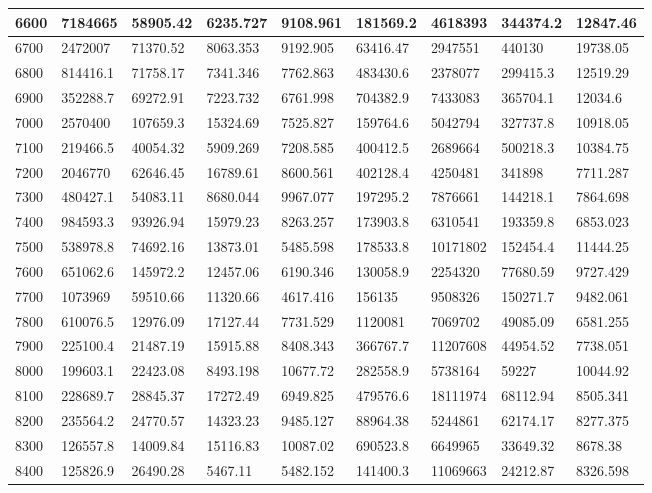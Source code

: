 \documentclass [11pt, proquest] {uwthesis}[2020/12/20]
\begin{document}
\begin{table}
\begin{tiny}
\begin{tabular}{|l|l|l|l|l|l|l|l|l|}
6600 & 7184665 & 58905.42 & 6235.727 & 9108.961 & 181569.2 & 4618393 & 344374.2 & 12847.46 \\ \hline
6700 & 2472007 & 71370.52 & 8063.353 & 9192.905 & 63416.47 & 2947551 & 440130 & 19738.05 \\ \hline
6800 & 814416.1 & 71758.17 & 7341.346 & 7762.863 & 483430.6 & 2378077 & 299415.3 & 12519.29 \\ \hline
6900 & 352288.7 & 69272.91 & 7223.732 & 6761.998 & 704382.9 & 7433083 & 365704.1 & 12034.6 \\ \hline
7000 & 2570400 & 107659.3 & 15324.69 & 7525.827 & 159764.6 & 5042794 & 327737.8 & 10918.05 \\ \hline
7100 & 219466.5 & 40054.32 & 5909.269 & 7208.585 & 400412.5 & 2689664 & 500218.3 & 10384.75 \\ \hline
7200 & 2046770 & 62646.45 & 16789.61 & 8600.561 & 402128.4 & 4250481 & 341898 & 7711.287 \\\hline
7300 & 480427.1 & 54083.11 & 8680.044 & 9967.077 & 197295.2 & 7876661 & 144218.1 & 7864.698 \\\hline
7400 & 984593.3 & 93926.94 & 15979.23 & 8263.257 & 173903.8 & 6310541 & 193359.8 & 6853.023 \\\hline
7500 & 538978.8 & 74692.16 & 13873.01 & 5485.598 & 178533.8 & 10171802 & 152454.4 & 11444.25 \\\hline
7600 & 651062.6 & 145972.2 & 12457.06 & 6190.346 & 130058.9 & 2254320 & 77680.59 & 9727.429 \\\hline
7700 & 1073969 & 59510.66 & 11320.66 & 4617.416 & 156135 & 9508326 & 150271.7 & 9482.061 \\\hline
7800 & 610076.5 & 12976.09 & 17127.44 & 7731.529 & 1120081 & 7069702 & 49085.09 & 6581.255 \\\hline
7900 & 225100.4 & 21487.19 & 15915.88 & 8408.343 & 366767.7 & 11207608 & 44954.52 & 7738.051 \\\hline
8000 & 199603.1 & 22423.08 & 8493.198 & 10677.72 & 282558.9 & 5738164 & 59227 & 10044.92 \\\hline
8100 & 228689.7 & 28845.37 & 17272.49 & 6949.825 & 479576.6 & 18111974 & 68112.94 & 8505.341 \\\hline
8200 & 235564.2 & 24770.57 & 14323.23 & 9485.127 & 88964.38 & 5244861 & 62174.17 & 8277.375 \\\hline
8300 & 126557.8 & 14009.84 & 15116.83 & 10087.02 & 690523.8 & 6649965 & 33649.32 & 8678.38 \\\hline
8400 & 125826.9 & 26490.28 & 5467.11 & 5482.152 & 141400.3 & 11069663 & 24212.87 & 8326.598 \\\hline

\end{tabular}
\end{tiny}
\end{table}
\end{document}
